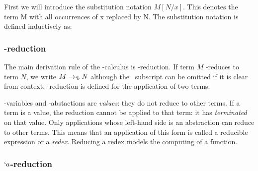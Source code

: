   First we will introduce the substitution notation $M[N/x]$. This denotes 
  the term M with all occurrences of x replaced by N. The substitution 
  notation is defined inductively as:
   
    \begin{figure}[!h]
    \end{figure}

\subsubsection{\bta-reduction}
  The main derivation rule of the \lam-calculus is \bta-reduction. If term
  $M$ \bta-reduces to term $N$, we write $M \rightarrow_{`b} N$ although 
  the \bta\ subscript can be omitted if it is clear from context. \bta-reduction
  is defined for the application of two terms:
  \begin{figure}[!h]\label{def:beta-reduction}
  \end{figure}
 
  \lam-variables and \lam-abstactions are \emph{values}: they do not reduce to other terms. 
  If a term is a value, the reduction cannot be applied to that term: it has \emph{terminated} on that value. 
  Only applications whose left-hand side is an abstraction can reduce to other terms. 
  This means that an application of this form is called a reducible expression or a \emph{redex}. 
  Reducing a redex models the computing of a function. 

\subsubsection{$`a$-reduction}
 
